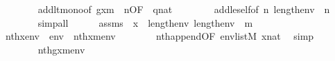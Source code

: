 \begin{isabellebody}
\ \ \ \ \ \ \isamarkupfalse%
\ add{\isacharunderscore}{\kern0pt}lt{\isacharunderscore}{\kern0pt}mono{}{\isacharbrackleft}{\kern0pt}of\ {\isachardoublequoteopen}g{\isacharbackquote}{\kern0pt}{\isacharparenleft}{\kern0pt}x{\isacharhash}{\kern0pt}{\isacharminus}{\kern0pt}m{\isacharparenright}{\kern0pt}{\isachardoublequoteclose}\ {\isacharunderscore}{\kern0pt}\ n{\isacharcomma}{\kern0pt}OF\ {\isacharunderscore}{\kern0pt}\ {\isacartoucheopen}q{\isasymin}nat{\isacartoucheclose}{\isacharbrackright}{\kern0pt}\isanewline
\ \ \ \ \ \ \ \ add{\isacharunderscore}{\kern0pt}le{\isacharunderscore}{\kern0pt}self{}{\isacharbrackleft}{\kern0pt}of\ n{\isacharbrackright}{\kern0pt}\ {\isacartoucheopen}length{\isacharparenleft}{\kern0pt}env{\isacharprime}{\kern0pt}{\isacharparenright}{\kern0pt}\ {\isacharequal}{\kern0pt}\ n{\isacartoucheclose}\isanewline
\ \ \ \ \ \ \isamarkupfalse%
\ simp{\isacharunderscore}{\kern0pt}all\isanewline
\ \ \ \ \isamarkupfalse%
\ assms\ {\isacartoucheopen}{\isasymnot}\ x\ {\isacharless}{\kern0pt}\ length{\isacharparenleft}{\kern0pt}env{\isacharparenright}{\kern0pt}{\isacartoucheclose}\ {\isacartoucheopen}length{\isacharparenleft}{\kern0pt}env{\isacharparenright}{\kern0pt}\ {\isacharequal}{\kern0pt}\ m{\isacartoucheclose}\isanewline
\ \ \ \ \isamarkupfalse%
\ {\isachardoublequoteopen}nth{\isacharparenleft}{\kern0pt}x{\isacharcomma}{\kern0pt}env\ {\isacharat}{\kern0pt}\ env{}{\isacharparenright}{\kern0pt}\ {\isacharequal}{\kern0pt}\ nth{\isacharparenleft}{\kern0pt}x{\isacharhash}{\kern0pt}{\isacharminus}{\kern0pt}m{\isacharcomma}{\kern0pt}env{}{\isacharparenright}{\kern0pt}{\isachardoublequoteclose}\isanewline
\ \ \ \ \ \ \isamarkupfalse%
\ nth{\isacharunderscore}{\kern0pt}append{\isacharbrackleft}{\kern0pt}OF\ {\isacartoucheopen}env{\isasymin}list{\isacharparenleft}{\kern0pt}M{\isacharparenright}{\kern0pt}{\isacartoucheclose}\ {\isacartoucheopen}x{\isasymin}nat{\isacartoucheclose}{\isacharbrackright}{\kern0pt}\ \isamarkupfalse%
\ simp\isanewline
\ \ \ \ \isamarkupfalse%
\isanewline
\ \ \ \ \isamarkupfalse%
\ {\isachardoublequoteopen}{\isachardot}{\kern0pt}{\isachardot}{\kern0pt}{\isachardot}{\kern0pt}\ {\isacharequal}{\kern0pt}\ nth{\isacharparenleft}{\kern0pt}g{\isacharbackquote}{\kern0pt}{\isacharparenleft}{\kern0pt}x{\isacharhash}{\kern0pt}{\isacharminus}{\kern0pt}m{\isacharparenright}{\kern0pt}{\isacharcomma}{\kern0pt}env{}{\isacharparenright}{\kern0pt}{\isachardoublequoteclose}\isanewline

\end{isabellebody}
